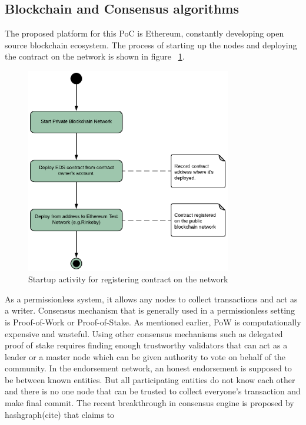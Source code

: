 \subsection{Blockchain and Consensus algorithms}
The proposed platform for this PoC is Ethereum, constantly developing open
source blockchain ecosystem. The process of starting up the nodes and deploying
the contract on the network is shown in figure ~\ref{fig:startup}.
\begin{figure}
	\centering
	\includegraphics[width=0.8\textwidth]{Images/ActivityDiagramStartUpBC.eps}
	\caption{Startup activity for registering contract on the network}
	\label{fig:startup}
\end{figure}
As a permissionless system, it allows any nodes to
collect transactions and act as a writer. Consensus mechanism that is generally
used in a permissionless setting is Proof-of-Work or Proof-of-Stake. As
mentioned earlier, PoW is computationally expensive and wasteful. Using other
consensus mechanisms such as delegated proof of stake requires finding enough
trustworthy validators that can act as a leader or a master node which can be
given authority to vote on behalf of the community. In the endorsement network,
an honest endorsement is supposed to be between known entities. But all
participating entities do not know each other and there is no one node that can
be trusted to collect everyone's transaction and make final commit.
The recent
breakthrough in consensus engine is proposed by hashgraph(cite) that claims to
